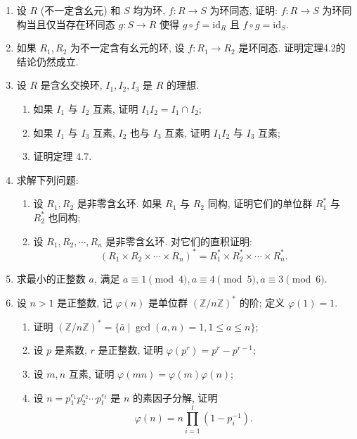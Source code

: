 \begin{enumerate}

\item 设 $ R $ (不一定含幺元) 和 $ S $ 均为环, $ f : R \to S $ 为环同态, 证明: $ f : R \to S $ 为环同构当且仅当存在环同态 $ g : S \to R $ 使得 $ g \circ f = \mathrm{id}_R $ 且 $ f \circ g = \mathrm{id}_S $.

\item 如果 $ R_1, R_2 $ 为不一定含有幺元的环, 设 $ f : R_1 \to R_2 $ 是环同态. 证明定理4.2的结论仍然成立.

\item 设 $ R $ 是含幺交换环, $ I_1, I_2, I_3 $ 是 $ R $ 的理想.
\begin{enumerate}[label=(\arabic*)]
    \item 如果 $ I_1 $ 与 $ I_2 $ 互素, 证明 $ I_1 I_2 = I_1 \cap I_2 $;
    \item 如果 $ I_1 $ 与 $ I_3 $ 互素, $ I_2 $ 也与 $ I_3 $ 互素, 证明 $ I_1 I_2 $ 与 $ I_3 $ 互素;
    \item 证明定理 4.7.
\end{enumerate}

\item 求解下列问题:
\begin{enumerate}[label=(\arabic*)]
    \item 设 $ R_1, R_2 $ 是非零含幺环. 如果 $ R_1 $ 与 $ R_2 $ 同构, 证明它们的单位群 $ R_1^* $ 与 $ R_2^* $ 也同构;
    \item 设 $ R_1, R_2, \cdots, R_n $ 是非零含幺环. 对它们的直积证明:
    \[
    (R_1 \times R_2 \times \cdots \times R_n)^* = R_1^* \times R_2^* \times \cdots \times R_n^*.
    \]
\end{enumerate}

\item 求最小的正整数 $ a $, 满足 $ a \equiv 1 \pmod{4}, a \equiv 4 \pmod{5}, a \equiv 3 \pmod{6} $.

\item 设 $ n > 1 $ 是正整数, 记 $ \varphi(n) $ 是单位群 $ (\mathbb{Z}/n\mathbb{Z})^* $ 的阶; 定义 $ \varphi(1) = 1 $.
\begin{enumerate}[label=(\arabic*)]
    \item 证明 $ (\mathbb{Z}/n\mathbb{Z})^* = \{\bar{a} \mid \gcd(a,n) = 1, 1 \leqslant a \leqslant n\} $;
    \item 设 $ p $ 是素数, $ r $ 是正整数, 证明 $ \varphi(p^r) = p^r - p^{r-1} $;
    \item 设 $ m, n $ 互素, 证明 $ \varphi(mn) = \varphi(m)\varphi(n) $;
    \item 设 $ n = p_1^{e_1} p_2^{e_2} \cdots p_t^{e_t} $ 是 $ n $ 的素因子分解, 证明
    \[
    \varphi(n) = n \prod_{i=1}^t (1 - p_i^{-1}).
    \]
\end{enumerate}


\end{enumerate}
